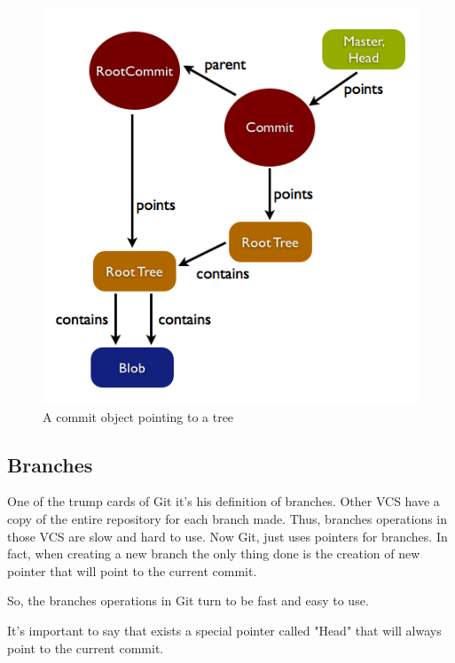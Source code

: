 \begin{figure}[h!] 
	\caption{A commit object pointing to a tree}
	\centering
	\includegraphics[scale=0.50]{images/commitobject.png}
\end{figure}

\subsection{Branches}
One of the trump cards of Git it's his definition of branches. Other VCS
have a copy of the entire repository for each branch made. Thus, branches
operations in those VCS are slow and hard to use. Now Git, just uses 
pointers for branches. In fact, when creating a new branch the only thing
done is the creation of new pointer that will point to the current commit. \par
So, the branches operations in Git turn to be fast and easy to use. \par
It's important to say that exists a special pointer called "Head" that will 
always point to the current commit. \par

